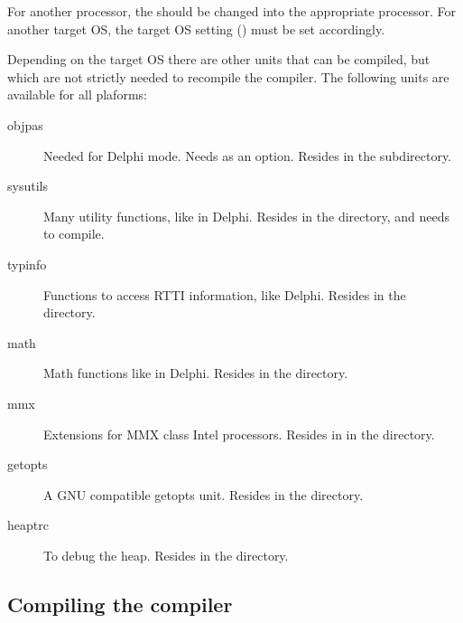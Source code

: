 For another processor, the  should be changed into the appropriate
processor. For another target OS, the target OS setting () must be 
set accordingly.

Depending on the target OS there are other units that can be 
compiled, but which are not strictly needed to recompile the compiler.
The following units are available for all plaforms:
\begin{description}
\item[objpas] Needed for Delphi mode. Needs  as an option. Resides
in the  subdirectory.
\item[sysutils] Many utility functions, like in Delphi. Resides in the
 directory, and needs  to compile.
\item[typinfo] Functions to access RTTI information, like Delphi. Resides in
the  directory.
\item[math] Math functions like in Delphi. Resides in the 
directory.
\item[mmx] Extensions for MMX class Intel processors. Resides in
in the  directory.
\item[getopts] A GNU compatible getopts unit. Resides in the 
directory.
\item[heaptrc] To debug the heap. Resides in the  directory.
\end{description}

\subsection{Compiling the compiler}

